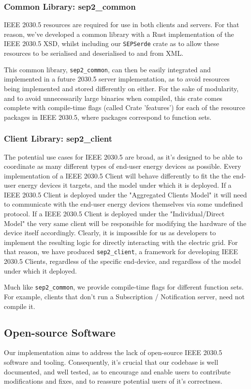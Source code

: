 \subsubsection{Common Library: \- sep2\_common}
IEEE 2030.5 resources are required for use in both clients and servers. For that reason, we've developed a common library with a Rust implementation of the IEEE 2030.5 XSD, whilst including our \texttt{SEPSerde} crate as to allow these resources to be serialised and deserialised to and from XML.

This common library, \texttt{sep2\_common}, can then be easily integrated and implemented in a future 2030.5 server implementation, as to avoid resources being implemented and stored differently on either. 
For the sake of modularity, and to avoid unnecessarily large binaries when compiled, this crate comes complete with compile-time flags (called Crate 'features') for each of the resource packages in IEEE 2030.5, where packages correspond to function sets.

\subsubsection{Client Library: \- sep2\_client}
The potential use cases for IEEE 2030.5 are broad, as it's designed to be able to coordinate as many different types of end-user energy devices as possible.
Every implementation of a IEEE 2030.5 Client will behave differently to fit the the end-user energy devices it targets, and the model under which it is deployed. 
If a IEEE 2030.5 Client is deployed under the "Aggregated Clients Model" it will need to communicate with the end-user energy devices themselves via some undefined protocol.
If a IEEE 2030.5 Client is deployed under the "Individual/Direct Model" the very same client will be responsible for modifying the hardware of the device itself accordingly. 
Clearly, it is impossible for us as developers to implement the resulting logic for directly interacting with the electric grid.
For that reason, we have produced \texttt{sep2\_client}, a framework for developing IEEE 2030.5 Clients, regardless of the specific end-device, and regardless of the model under which it deployed.

Much like \texttt{sep2\_common}, we provide compile-time flags for different function sets. For example, clients that don't run a Subscription / Notification server, need not compile it.

\subsection{Open-source Software}
Our implementation aims to address the lack of open-source IEEE 2030.5 software and tooling. Consequently, it's crucial that our codebase is well documented, and well tested, as to encourage and enable users to contribute modifications and fixes, and to reassure potential users of it's correctness.


